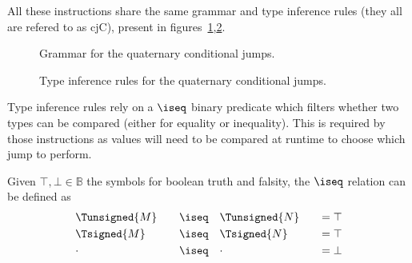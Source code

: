 All these instructions share the same grammar and type inference rules (they all are refered to as {\Iformat cjC}), present in figures~\ref{fig:nstar-instructionset-terminal-cjX-tetradic-grammar},\ref{fig:nstar-instructionset-terminal-cjX-tetradic-typerules}.

\begin{figure}[H]
	\centering


	\caption{Grammar for the quaternary conditional jumps.}
	\label{fig:nstar-instructionset-terminal-cjX-tetradic-grammar}
\end{figure}

\begin{figure}[H]
	\centering


	\caption{Type inference rules for the quaternary conditional jumps.}
	\label{fig:nstar-instructionset-terminal-cjX-tetradic-typerules}
\end{figure}

Type inference rules rely on a $\iseq$ binary predicate which filters whether two types can be compared (either for equality or inequality).
This is required by those instructions as values will need to be compared at runtime to choose which jump to perform.

Given $\top,\bot \in \mathbb{B}$ the symbols for boolean truth and falsity, the $\iseq$ relation can be defined as
\begin{alignat*}{4}
	 & \Tunsigned{M} \quad & \iseq & \quad \Tunsigned{N} \quad & = \top \\
	 & \Tsigned{M}   \quad & \iseq & \quad \Tsigned{N}   \quad & = \top \\
	 & \cdot         \quad & \iseq & \quad \cdot         \quad & = \bot
\end{alignat*}

